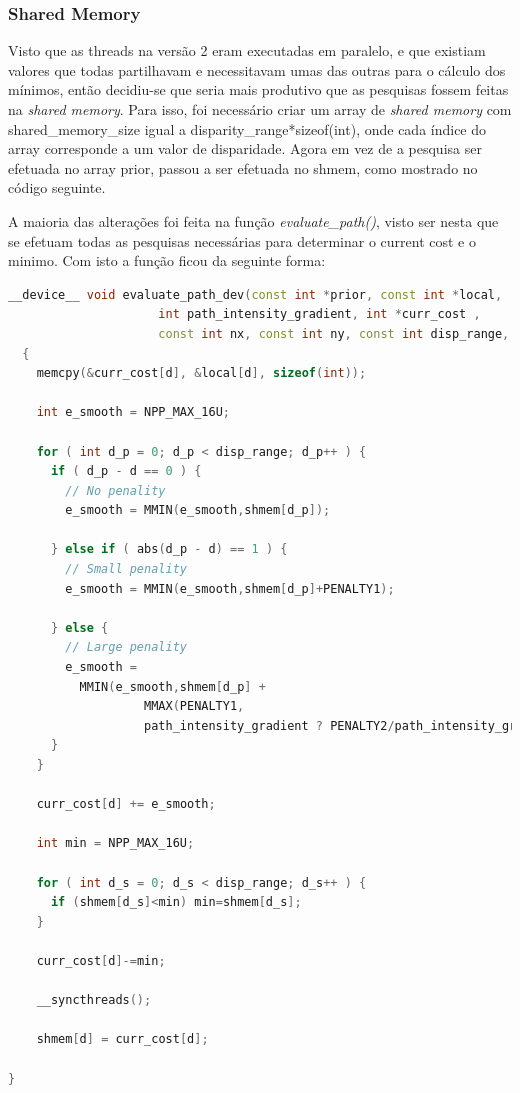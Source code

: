 \documentclass[pdftex,12pt,a4paper]{report}
\begin{document}
\newpage
\subsubsection{Shared Memory}

Visto que as threads na versão 2 eram executadas em paralelo, e que existiam valores que todas partilhavam e necessitavam umas das outras para o cálculo dos mínimos, então decidiu-se que seria mais produtivo que as pesquisas fossem feitas na \textit{shared memory}. Para isso, foi necessário criar um array de \textit{shared memory} com shared\_memory\_size igual a disparity\_range*sizeof(int), onde cada índice do array corresponde a um valor de disparidade. Agora em vez de a pesquisa ser efetuada no array prior, passou a ser efetuada no shmem, como mostrado no código seguinte.

A maioria das alterações foi feita na função \textit{evaluate\_path()}, visto ser nesta que se efetuam todas as pesquisas necessárias para determinar o current cost e o minimo. Com isto a função ficou da seguinte forma:

  \begin{lstlisting}[language=c++, basicstyle=\scriptsize]
__device__ void evaluate_path_dev(const int *prior, const int *local,
                     int path_intensity_gradient, int *curr_cost ,
                     const int nx, const int ny, const int disp_range, const int d, int shmem[])
  {
    memcpy(&curr_cost[d], &local[d], sizeof(int));
    
    int e_smooth = NPP_MAX_16U;

    for ( int d_p = 0; d_p < disp_range; d_p++ ) {
      if ( d_p - d == 0 ) {
        // No penality
        e_smooth = MMIN(e_smooth,shmem[d_p]);
        
      } else if ( abs(d_p - d) == 1 ) {
        // Small penality
        e_smooth = MMIN(e_smooth,shmem[d_p]+PENALTY1);
        
      } else {
        // Large penality
        e_smooth =
          MMIN(e_smooth,shmem[d_p] +
                   MMAX(PENALTY1,
                   path_intensity_gradient ? PENALTY2/path_intensity_gradient : PENALTY2));
      }
    }

    curr_cost[d] += e_smooth;

    int min = NPP_MAX_16U;
    
    for ( int d_s = 0; d_s < disp_range; d_s++ ) {
      if (shmem[d_s]<min) min=shmem[d_s];
    }
    
    curr_cost[d]-=min;
    
    __syncthreads();
    
    shmem[d] = curr_cost[d];

}

\end{lstlisting} 
\end{document}
